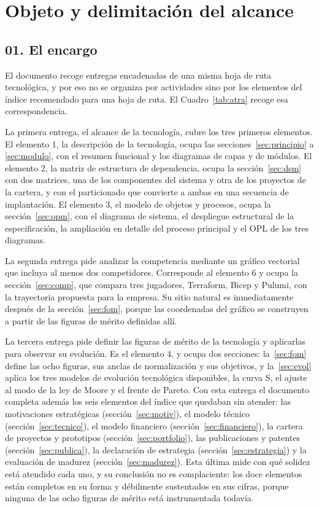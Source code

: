 \documentclass[11pt,letterpaper]{article}
\newcommand{\subsec}[1]{%
  \subsection*{#1}%
  \phantomsection\addcontentsline{toc}{subsection}{#1}}
\begin{document}
\section{Objeto y delimitación del alcance}
\label{sec:alcance}

\subsec{01. El encargo}

El documento recoge entregas encadenadas de una misma hoja de ruta
tecnológica, y por eso no se organiza por actividades sino por los elementos
del índice recomendado para una hoja de ruta. El Cuadro~\ref{tab:atra} recoge
esa correspondencia.

La primera entrega, el alcance de la tecnología, cubre los tres primeros
elementos. El elemento 1, la descripción de la tecnología, ocupa las
secciones~\ref{sec:principio} a \ref{sec:modulo}, con el resumen funcional y
los diagramas de capas y de módulos. El elemento 2, la matriz de estructura de
dependencia, ocupa la sección~\ref{sec:dsm} con dos matrices, una de los
componentes del sistema y otra de los proyectos de la cartera, y con el
particionado que convierte a ambas en una secuencia de implantación. El
elemento 3, el modelo de objetos y procesos, ocupa la
sección~\ref{sec:opm}, con el diagrama de sistema, el despliegue estructural
de la especificación, la ampliación en detalle del proceso principal y el OPL
de los tres diagramas.

La segunda entrega pide analizar la competencia mediante un gráfico vectorial
que incluya al menos dos competidores. Corresponde al elemento 6 y ocupa la
sección~\ref{sec:comp}, que compara tres jugadores, Terraform, Bicep y
Pulumi, con la trayectoria propuesta para la empresa. Su sitio natural es
inmediatamente después de la sección~\ref{sec:fom}, porque las coordenadas del
gráfico se construyen a partir de las figuras de mérito definidas allí.

La tercera entrega pide definir las figuras de mérito de la tecnología y
aplicarlas para observar su evolución. Es el elemento 4, y ocupa dos
secciones: la~\ref{sec:fom} define las ocho figuras, sus anclas de
normalización y sus objetivos, y la~\ref{sec:evol} aplica los tres modelos de
evolución tecnológica disponibles, la curva S, el ajuste al modo de la ley de
Moore y el frente de Pareto. Con esta entrega el documento completa además los
seis elementos del índice que quedaban sin atender: las motivaciones
estratégicas (sección~\ref{sec:motiv}), el modelo técnico
(sección~\ref{sec:tecnico}), el modelo financiero
(sección~\ref{sec:financiero}), la cartera de proyectos y prototipos
(sección~\ref{sec:portfolio}), las publicaciones y patentes
(sección~\ref{sec:publica}), la declaración de estrategia
(sección~\ref{sec:estrategia}) y la evaluación de madurez
(sección~\ref{sec:madurez}). Esta última mide con qué solidez está atendido
cada uno, y su conclusión no es complaciente: los doce elementos están
completos en su forma y débilmente sustentados en sus cifras, porque ninguna
de las ocho figuras de mérito está instrumentada todavía.
\end{document}
